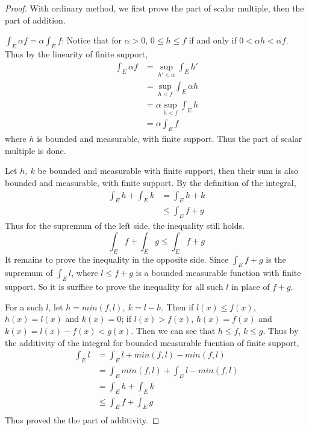 \documentclass[lang=en, 12pt]{elegantbook}
\begin{document}
            \begin{proof}
                With ordinary method, we first prove the part of scalar multiple, then the part of addition.\par
                $\int_E \alpha f = \alpha \int_E f$: Notice that for $\alpha > 0 $, $0 \leq h \leq f$ if and only if $0<\alpha h < \alpha f$.
            Thus by the linearity of finite support, 
            \begin{equation*}
                \begin{aligned}
                    \int_E \alpha f &= \sup_{h' < \alpha} \int_E h'\\
                    &=\sup_{h < f} \int_E \alpha h \\
                    &= \alpha \sup_{h < f} \int_E h \\
                    &=\alpha \int_E f 
                \end{aligned}
            \end{equation*}
            where $h$ is bounded and measurable, with finite support. Thus the part of scalar multiple is done.\par
            Let $h , \ k$ be bounded and measurable with finite support, then their sum is also bounded and measurable, with finite support.
            By the definition of the integral,
            \begin{equation*}
                \begin{aligned}
                    \int_E h + \int_E k &=\int_E h + k\\
                    &\leq \int_E f+g 
                \end{aligned}
            \end{equation*}
            Thus for the supremum of the left side, the inequality still holds.
            $$\int_E f +\int_E g \leq \int_E f+g$$
            It remains to prove the inequality in the opposite side. Since $\int_E f+g$ is the supremum of $\int_E l$, where $l \leq f+g$
            is a bounded measurable function with finite support. So it is surffice to  prove the inequality for all such $l$ in place of 
            $f+g$.\par
                For a such $l$, let $h = min(f, l), \ k= l-h$. Then if $l(x) \leq f(x)$, $h(x) = l(x)$ and $k(x)= 0$; if $l(x) > f(x)$,
            $h(x)=f(x)$ and $k(x) = l(x)-f(x) < g(x)$. Then we can see that $h \leq f$, $k \leq g$. Thus by the additivity of the integral 
            for bounded measurable fucntion of finite support,
            \begin{equation*}
                \begin{aligned}
                    \int_E l &= \int_E l + min(f, l) - min(f,l)\\
                    &=  \int_E min(f, l) + \int_E l - min(f,l)\\
                    &= \int_E h + \int_E k \\
                    &\leq \int_E f + \int_E g\\
                \end{aligned}
            \end{equation*}
            Thus proved the the part of additivity.
            \end{proof}
\end{document}
